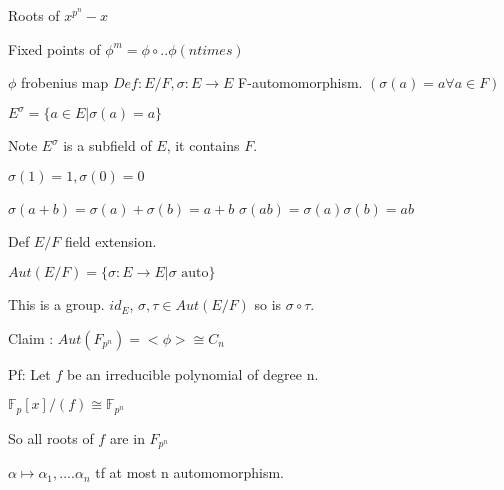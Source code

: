 \documentclass[twoside]{article}
\newcommand{\F}{\mathbb{F}}
\begin{document}
    Roots of $x^{p^n} - x$

    Fixed points of $\phi^m = \phi \circ .. \phi (n times)$

    $\phi$ frobenius map
    $Def: E/F, \sigma: E \rightarrow E $ F-automomorphism. 
    $(\sigma(a) = a \forall a \in F)$

    $E^{\sigma} = \{a \in E \vert \sigma(a) = a\}$

    Note $E^\sigma $ is a subfield of $E$, it contains $F$. 

    $\sigma(1) = 1, \sigma(0) = 0$

    $\sigma(a+b) = \sigma(a) + \sigma(b) = a + b$
    $\sigma(ab) = \sigma(a)\sigma(b) = ab$

    Def $E/F$ field extension. 

    $Aut(E/F) = \{\sigma: E \rightarrow E \vert \sigma \text{  auto}\}$

    This is a group. $id_E$, $\sigma, \tau \in Aut(E/F)$ so is $\sigma \circ \tau$. 

    Claim : $Aut(F_{p^n}) = <\phi> \cong C_n$

    Pf: Let $f$ be an irreducible polynomial of degree n. 
    
    $\F_p[x]/(f) \cong \F_{p^n}$

    So all roots of $f$ are in $F_{p^n}$

    $\alpha \mapsto \alpha_1, .... \alpha_n$ tf at most n automomorphism. 
\end{document}
